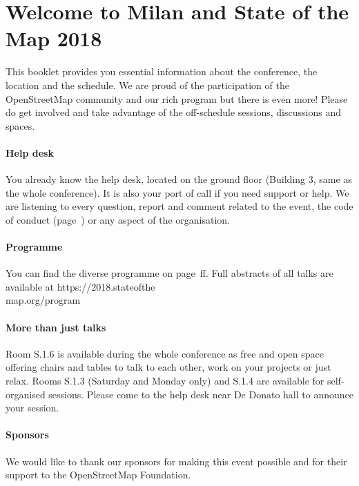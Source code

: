 \newpage
\enlargethispage{1\baselineskip}
\section*{Welcome to Milan and State of the Map 2018} \label{welcome}
This booklet provides you essential information
about the conference, the location and the schedule.  We are proud of the participation of the
OpenStreetMap community and our rich program but there is even more!  Please do get involved and
take advantage of the off-schedule sessions, discussions and spaces.

\paragraph*{Help desk} \label{welcome-helpdesk}
You already know the help desk, located on the ground floor (Building 3, same as the whole
conference). It is also your port of call if you need support or help. We are listening to every
question, report and comment related to the event, the code of conduct (page~\pageref{coc}) or any
aspect of the organisation.

\paragraph*{Programme}
You can find the diverse programme on page~\pageref{saturday}ff. Full abstracts of all talks are available at https://2018.stateofthe\\map.org/program

\paragraph*{More than just talks} \label{welcome-location}
Room S.1.6 is available during the whole conference as free and open space offering chairs and tables
to talk to each other, work on your projects or just relax. Rooms S.1.3 (Saturday and Monday only) and S.1.4 are available for
self-organised sessions.  Please come to the help desk near De Donato hall to announce your session.

\paragraph*{Sponsors} \label{welcome-sponsors}
We would like to thank our sponsors for making this event possible and for their support to the
OpenStreetMap Foundation.
\newpage
